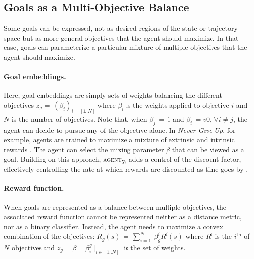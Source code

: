 \subsection{Goals as a Multi-Objective Balance}
Some goals can be expressed, not as desired regions of the state or trajectory space but as more general objectives that the agent should maximize. In that case, goals can parameterize a particular mixture of multiple objectives that the agent should maximize.

\paragraph{Goal embeddings.} Here, goal embeddings are simply sets of weights balancing the different objectives $z_g\,=\,(\beta_i)_{i=[1..N]}$ where $\beta_i$ is the weights applied to objective $i$ and $N$ is the number of objectives. Note that, when $\beta_j\,=\,1$ and $\beta_i\,=v0,~\forall i\neq j$, the agent can decide to pursue any of the objective alone. In \textit{Never Give Up}, for example, \rl agents are trained to maximize a mixture of extrinsic and intrinsic rewards \cite{badia2020never}. The agent can select the mixing parameter $\beta$ that can be viewed as a goal. Building on this approach, \textsc{agent$_{57}$} adds a control of the discount factor, effectively controlling the rate at which rewards are discounted as time goes by \cite{badia2020agent57}.

\paragraph{Reward function.} When goals are represented as a balance between multiple objectives, the associated reward function cannot be represented neither as a distance metric, nor as a binary classifier. Instead, the agent needs to maximize a convex combination of the objectives: $R_g(s)\,=\,\sum_{i=1}^N~\beta_g^i R^i(s)$ where $R^i$ is the $i^\text{th}$ of $N$ objectives and $z_g=\beta=\beta_i^g\mid_{i\in[1..N]}$ is the set of weights.

